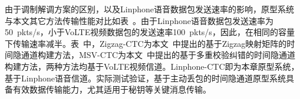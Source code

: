 
由于调制解调方案的区别，以及Linphone语音数据包发送速率的影响，原型系统与本文其它方法传输性能对比如表\ 。由于Linphone语音数据包发送速率为{50\ pkts/s}，小于VoLTE视频数据包的发送速率{100\ pkts/s}，因此，在相同的容量下传输速率减半。表\ 中，Zigzag-CTC为本文\ 中提出的基于Zigzag映射矩阵的时间隐通道构建方法，MSV-CTC为本文\ 中提出的基于多重校验纠错的时间隐通道构建方法，两种方法均基于VoLTE视频信道。Linphone-CTC即为本章原型系统，基于Linphone语音信道。实际测试验证，基于主动丢包的时间隐通道原型系统具备有效数据传输能力，尤其适用于秘钥等关键消息传输。